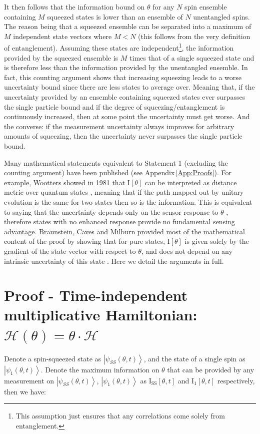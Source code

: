 \documentclass[reqno]{amsart}
\newcommand{\ket}[1]{\left| #1 \right>}
\newcommand{\hham}{\mathcal{H}}
\def\func#1#2{\mathrm{#1}\left[#2\right]}
\def\funcwrt#1#2#3{\mathrm{#1}_{\mathrm{#3}}\left[#2\right]}
\begin{document}
It then follows that the information bound on $\theta$ for any $N$ spin ensemble containing $M$ squeezed states is lower than an ensemble of $N$ unentangled spins. The reason being that a squeezed ensemble can be separated into a maximum of $M$ independent state vectors where $M < N$ (this follows from the very definition of entanglement). Assuming these states are independent\footnote{This assumption just ensures that any correlations come solely from entanglement.}, the information provided by the squeezed ensemble is $M$ times that of a single squeezed state and is therefore less than the information provided by the unentangled ensemble. In fact, this counting argument shows that increasing squeezing leads to a worse uncertainty bound since there are less states to average over. Meaning that, if the uncertainty provided by an ensemble containing squeezed states ever surpasses the single particle bound and if the degree of squeezing/entanglement is continuously increased, then at some point the uncertainty must get worse. And the converse: if the measurement uncertainty always improves for arbitrary amounts of squeezing, then the uncertainty never surpasses the single particle bound.

Many mathematical statements equivalent to Statement 1 (excluding the counting argument) have been published (see Appendix\,\ref{App:Proofs}). For example, Wootters showed in 1981 that $\func{I}{\theta}$ can be interpreted as distance metric over quantum states \cite{Wootters1981}, meaning that if the path mapped out by unitary evolution is the same for two states then so is the information. This is equivalent to saying that the uncertainty depends only on the sensor response to $\theta$ \cite{Ou1997, Childs2000, Giovannetti2004, Zwierz2012, Pang2014, Yuan2015, Pang2017, Gorecki2020}, therefore states with no enhanced response provide no fundamental sensing advantage. Braunstein, Caves and Milburn provided most of the mathematical content of the proof by showing that for pure states, $\func{I}{\theta}$ is given solely by the gradient of the state vector with respect to $\theta$, and does not depend on any intrinsic uncertainty of this state \cite{Braunstein1996}. Here we detail the arguments in full.

\section*{Proof - Time-independent multiplicative Hamiltonian: $\hham(\theta) = \theta \cdot \hham$}
Denote a spin-squeezed state as $\ket{\psi_{SS}(\theta,t)}$, and the state of a single spin as $\ket{\psi_1(\theta,t)}$. Denote the maximum information on $\theta$ that can be provided by any measurement on $\ket{\psi_{SS}(\theta,t)}$, $\ket{\psi_1(\theta,t)}$ as $\funcwrt{I}{\theta, t}{SS}$ and $\funcwrt{I}{\theta, t}{1}$ respectively, then we have:\\
\end{document}
